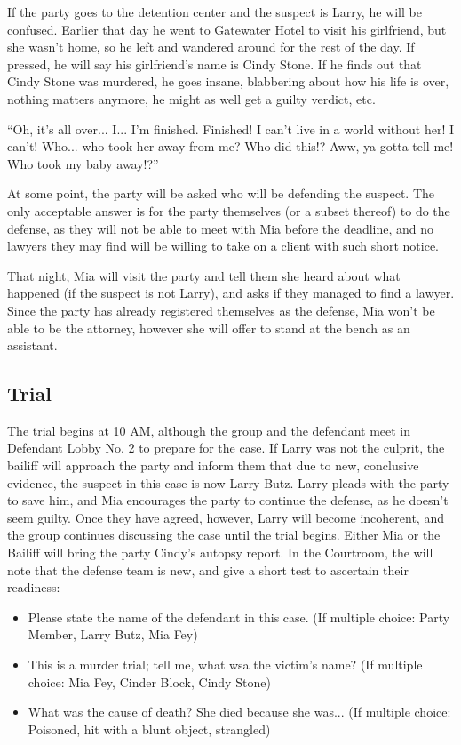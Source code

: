 If the party goes to the detention center and the suspect is Larry, he will be confused. Earlier that day he went to Gatewater Hotel to visit his girlfriend, but she wasn't home, so he left and wandered around for the rest of the day. If pressed, he will say his girlfriend's name is Cindy Stone. If he finds out that Cindy Stone was murdered, he goes insane, blabbering about how his life is over, nothing matters anymore, he might as well get a guilty verdict, etc. 

\begin{center}
``Oh, it's all over... I... I'm finished. Finished! I can't live in a world without her! I can't! Who... who took her away from me? Who did this!? Aww, ya gotta tell me! Who took my baby away!?''
\end{center}

At some point, the party will be asked who will be defending the suspect. The only acceptable answer is for the party themselves (or a subset thereof) to do the defense, as they will not be able to meet with Mia before the deadline, and no lawyers they may find will be willing to take on a client with such short notice.

That night, Mia will visit the party and tell them she heard about what happened (if the suspect is not Larry), and asks if they managed to find a lawyer. Since the party has already registered themselves as the defense, Mia won't be able to be the attorney, however she will offer to stand at the bench as an assistant. 

\subsection{Trial}
The trial begins at 10 AM, although the group and the defendant meet in Defendant Lobby No. 2 to prepare for the case. If Larry was not the culprit, the bailiff will approach the party and inform them that due to new, conclusive evidence, the suspect in this case is now Larry Butz. Larry pleads with the party to save him, and Mia encourages the party to continue the defense, as he doesn't seem guilty. Once they have agreed, however, Larry will become incoherent, and the group continues discussing the case until the trial begins. Either Mia or the Bailiff will bring the party Cindy's autopsy report. In the Courtroom, the  will note that the defense team is new, and give a short test to ascertain their readiness:
\begin{itemize}
\item Please state the name of the defendant in this case. (If multiple choice: Party Member, Larry Butz, Mia Fey)
\item This is a murder trial; tell me, what wsa the victim's name? (If multiple choice: Mia Fey, Cinder Block, Cindy Stone)
\item What was the cause of death? She died because she was... (If multiple choice: Poisoned, hit with a blunt object, strangled)
\end{itemize}

